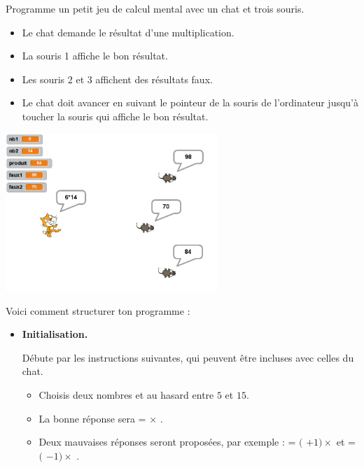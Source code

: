 \documentclass[class=report,crop=false, 12pt]{standalone}
\begin{document}
\begin{activite}

Programme un petit jeu de calcul mental avec un chat et trois souris.
\begin{itemize}
  \item Le chat demande le résultat d'une multiplication.
  \item La souris 1 affiche le bon résultat.
  \item Les souris 2 et 3 affichent des résultats faux.
  \item Le chat doit avancer en suivant le pointeur de la souris de l'ordinateur jusqu'à toucher la souris qui affiche le bon résultat.
\end{itemize}

\begin{center}
  \includegraphics[width=0.6\textwidth]{ecran-08-ex2} 
\end{center}

\bigskip
Voici comment structurer ton programme :

\bigskip

\begin{itemize}
  \item \textbf{Initialisation.}
  
  Débute par les instructions suivantes, qui peuvent être incluses avec celles du chat.
  \begin{itemize}
    \item Choisis deux nombres  et  au hasard entre $5$ et $15$.
    \item La bonne réponse sera  =  $\times$  .
    \item Deux mauvaises réponses seront proposées, par exemple :   
     = $($ $+1) \times$   et     
     = $($ $-1) \times$  .
        

\end{itemize}
\end{itemize}
\end{activite}
\end{document}
